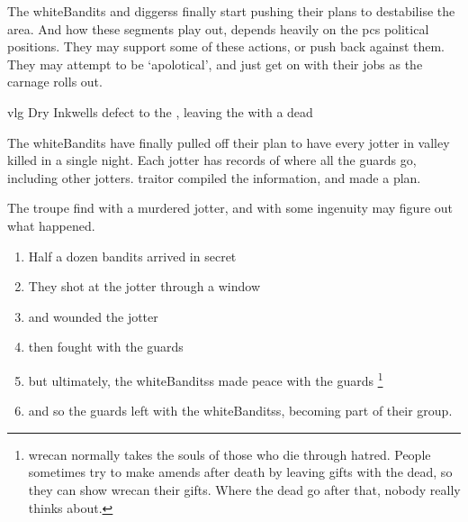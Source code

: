 \label{risingTitles}

\noindent
The \gls{whiteBandits} and \glspl{diggers} finally start pushing their plans to destabilise the area.
And how these \glspl{segment} play out, depends heavily on the \glspl{pc} political positions.
They may support some of these actions, or push back against them.
They may attempt to be `apolotical', and just get on with their jobs as the carnage rolls out.

{\gls{vlg} Dry Inkwells}%
{ defect to the , leaving the  with a dead }%

\begin{exampletext}
  The \gls{whiteBandits} have finally pulled off their plan to have every \gls{jotter} in \gls{valley} killed in a single night.
  Each \gls{jotter} has records of where all the \glspl{guard} go, including other \glspl{jotter}.
  \Gls{traitor} compiled the information, and made a plan.
\end{exampletext}

The troupe find  with a murdered \gls{jotter}, and with some ingenuity may figure out what happened.

\begin{enumerate}
  \item
  Half a dozen bandits arrived in secret
  \item
  They shot at the \gls{jotter} through a window
  \item
  and wounded the \gls{jotter}
  \item
  then fought with the \glspl{guard}
  \item
  but ultimately, the \glspl{whiteBandits} made peace with the \glspl{guard}
  \footnote{\Gls{wrecan} normally takes the souls of those who die through hatred.  People sometimes try to make amends after death by leaving gifts with the dead, so they can show \gls{wrecan} their gifts.  Where the dead go after that, nobody really thinks about.}
  \item
  and so the \glspl{guard} left with the \glspl{whiteBandits}, becoming part of their group.
\end{enumerate}

